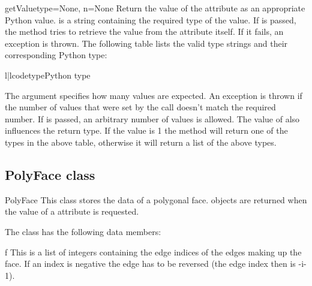 \begin{methoddesc}{getValue}{type=None, n=None}
\label{AttributeGetValue}
Return the value of the attribute as an appropriate Python value.
 is a string containing the required type of the value.
If  is passed, the method tries to retrieve the value from
the attribute itself. If it fails, an exception is thrown. The following
table lists the valid type strings and their corresponding Python type:

\begin{tableii}{l|l}{code}{type}{Python type}
\end{tableii}

The argument  specifies how many values are expected. An exception
is thrown if the number of values that were set by the  call
doesn't match the required number. If  is passed, an arbitrary
number of values is allowed. The value of  also influences the
return type. If the value is 1 the method will return one of the types
in the above table, otherwise it will return a list of the above types.

\end{methoddesc}

\subsection{PolyFace class}
\label{polyface}

\begin{classdesc*}{PolyFace}
This class stores the data of a polygonal face.  objects
are returned when the value of a  attribute is requested.
\end{classdesc*}

The class has the following data members:

\begin{memberdesc}{f}
This is a list of integers containing the edge indices of the edges 
making up the face. If an index is negative the edge has to be
reversed (the edge index then is -i-1).
\end{memberdesc}

